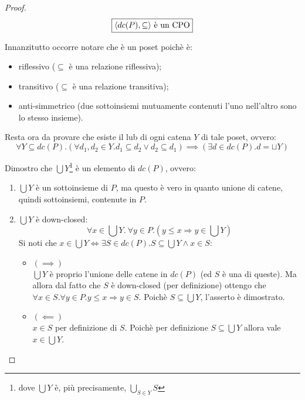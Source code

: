 \begin{proof}

$$
\boxed{\text{\ensuremath{\langle{}dc(P), \subseteq\rangle{}} è un CPO}}
$$

Innanzitutto occorre notare che  è un poset poichè è:

\begin{itemize}
  \item riflessivo ($\subseteq$ è una relazione riflessiva);
  \item transitivo ($\subseteq$ è una relazione transitiva);
  \item anti-simmetrico (due sottoinsiemi mutuamente contenuti l'uno nell'altro
    sono lo stesso insieme).
\end{itemize}

Resta ora da provare che esiste il lub di ogni catena $Y$ di tale poset, ovvero:
$$
\forall{Y}\subseteq dc(P).
          (\forall{d_1,d_2}\in Y.d_1 \subseteq d_2 \lor d_2 \subseteq d_1)
              \implies
          (\exists{d}\in dc(P). d = \sqcup Y)
$$

Dimostro che $\bigcup Y$\footnote{dove $\bigcup Y$ è, più precisamente,
$\bigcup\limits_{S\in{Y}}S$} è un elemento di $dc(P)$, ovvero:
\begin{enumerate}
	\item $\bigcup Y$ è un sottoinsieme di $P$, ma questo è vero in quanto 
unione di catene, quindi sottoinsiemi, contenute in $P$.
	\item $\bigcup Y$ è down-closed:
	$$
	\forall x \in \bigcup Y.\ \forall y \in P.(y \leq x \Rightarrow y \in \bigcup Y)
	$$
	Si noti che
	$x \in \bigcup Y \iff \exists S \in dc(P).
		S \subseteq \bigcup Y \land x \in S$:
	\begin{itemize}
          \item $(\implies)$ \\
            $\bigcup Y$ è proprio l'unione delle catene in $dc(P)$ (ed $S$ è una
            di queste). Ma allora dal fatto che $S$ è down-closed 
            (per definizione) ottengo che 
            $\forall x \in S.\forall y \in P. y \leq x \Rightarrow y \in S$.
            Poichè $S \subseteq \bigcup Y$, l'asserto è dimostrato.
          \item $(\impliedby)$ \\
            $x \in S$ per definizione di $S$. Poichè per definizione
            $S \subseteq \bigcup Y$ allora vale $x \in \bigcup Y$.
        \end{itemize}
	\end{enumerate}



\end{proof}
